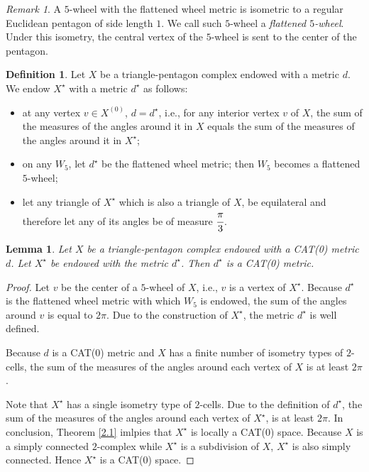 \documentclass{amsart}
\newtheorem{lemma}[theorem]{Lemma}
\theoremstyle{definition}
\newtheorem{definition}{Definition}[section]
\theoremstyle{remark}
\newtheorem*{remark}{Remark}
\numberwithin{equation}{section}
\begin{document}
\begin{remark}
A $5$-wheel with the flattened wheel metric is isometric to a regular Euclidean pentagon of side length $1$. We call such $5$-wheel a \emph{flattened $5$-wheel}. Under this isometry, the central vertex of the $5$-wheel is sent to the center of the pentagon.
\end{remark}

\begin{definition}
Let $X$ be a triangle-pentagon complex endowed with a metric $d$. We endow $X^{\star}$ with a metric $d^{\star}$ as follows:
\begin{itemize}

\item at any vertex $v \in X^{(0)}$, $d = d^{\star}$, i.e., for any interior vertex $v$ of $X$, the sum of the measures of the angles around it in $X$ equals the sum of the measures of the angles around it in $X^{\star}$;

\item on any $W_{5}$, let $d^{\star}$ be the flattened wheel metric; then $W_{5}$ becomes a flattened $5$-wheel;

\item let any triangle of $X^{\star}$ which is also a triangle of $X$, be equilateral and therefore let any of its angles be of measure $\cfrac{\pi}{3}$. 
\end{itemize}
\end{definition}

\begin{lemma}\label{3.1}
Let $X$ be a triangle-pentagon complex endowed with a CAT(0) metric $d$. Let $X^{\star}$ be endowed with the metric $d^{\star}$. Then $d^{\star}$ is a CAT(0) metric.
\end{lemma}

\begin{proof}
Let $v$ be the center of a $5$-wheel of $X$, i.e., $v$ is a vertex of $X^{\star}$.
Because $d^{\star}$ is the flattened wheel metric with which $W_{5}$ is endowed, the sum of the angles around $v$ is equal to $2 \pi$.  Due to the construction of $X^{\star}$, the metric $d^{\star}$ is well defined.

Because $d$ is a CAT(0) metric and $X$ has a finite number of isometry types of $2$-cells, the sum of the measures of the angles around each vertex of $X$ is at least $2 \pi$.

Note that $X^{\star}$ has a single isometry type of $2$-cells. Due to the definition of $d^{\star}$, the sum of the measures of the angles around each vertex of $X^{\star}$, is at least $2 \pi$. In conclusion, Theorem \ref{2.1} imlpies that $X^{\star}$ is locally a CAT(0) space. Because $X$ is a simply connected $2$-complex while $X^{\star}$ is a subdivision of $X$, $X^{\star}$ is also simply connected. Hence $X^{\star}$ is a CAT(0) space.
\end{proof}
\end{document}
